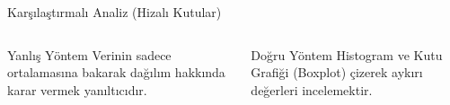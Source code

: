 \begin{frame}{Karşılaştırmalı Analiz (Hizalı Kutular)}
    \vspace{1em}
    
    \begin{columns}[t]
        
        \begin{alertblock}{Yanlış Yöntem}
            Verinin sadece ortalamasına bakarak dağılım hakkında karar vermek yanıltıcıdır.
        \end{alertblock}
        
        \begin{exampleblock}{Doğru Yöntem}
            Histogram ve Kutu Grafiği (Boxplot) çizerek aykırı değerleri incelemektir.
        \end{exampleblock}
        
    \end{columns}

\end{frame}
